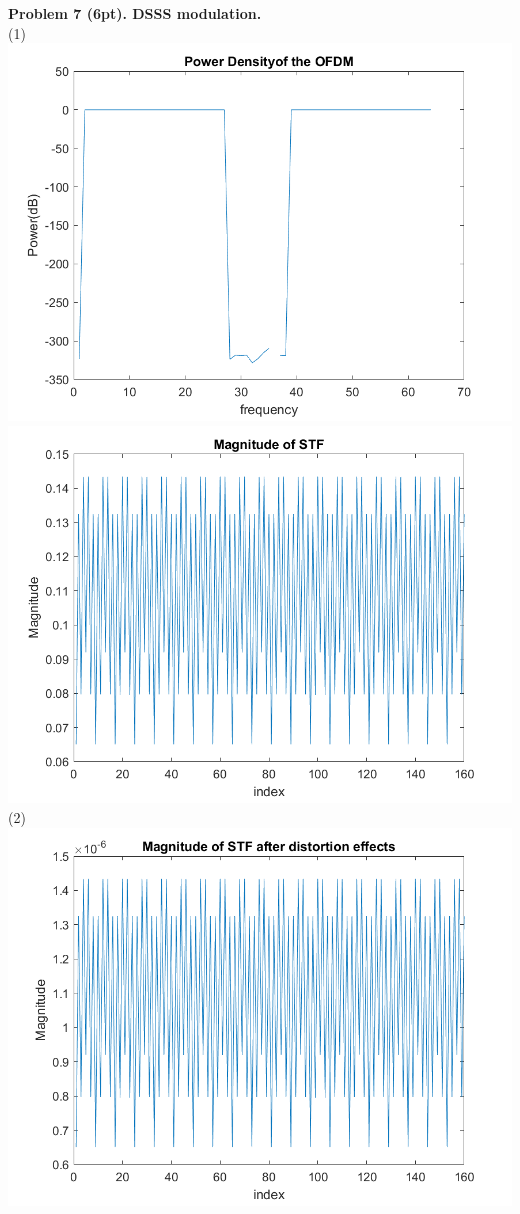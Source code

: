 \documentclass[12pt]{article}
\begin{document}
\noindent \textbf{Problem 7 (6pt). DSSS modulation.\\}
(1)\\
\includegraphics[scale=0.8]{Power_Spectrum_Density.png}\\
\includegraphics[scale=0.8]{Magnitude of STF.png}\\
(2)\\
\includegraphics[scale=0.8]{Magnitude_of_STF_after_distortion_effects.png}\\
\end{document}
